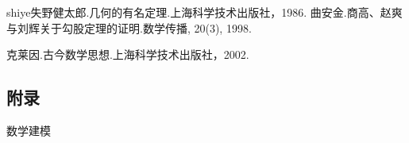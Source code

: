 \documentclass[UTF-8]{ctexart}
\begin{document}
\begin{thebibliography}{99}   
	\bibitem
		{shiye}失野健太郎.几何的有名定理.上海科学技术出版社，1986.                  
		曲安金.商高、赵爽与刘辉关于勾股定理的证明.数学传播, 20(3), 1998. 

	克莱因.古今数学思想.上海科学技术出版社，2002.
\end{thebibliography}




\begin{appendix}            
	\section{附录}
	\songti\xiaosi 数学建模
\end{appendix}
\end{document}
